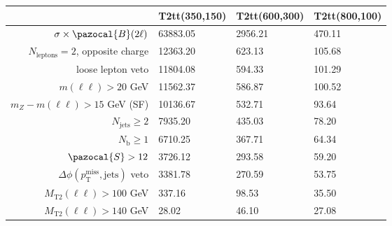\documentclass[10pt,oneside]{report}
\begin{document}
\begin{preview}
\begin{tabular}{r|lll}
                                                                    & T2tt(350,150) & T2tt(600,300) & T2tt(800,100) \\\hline
  $\sigma \times \pazocal{B}(2\ell)$                                &      63883.05 &       2956.21 &        470.11 \\
  $N_{\textrm{leptons}}=2$, opposite charge                         &      12363.20 &        623.13 &        105.68 \\
  loose lepton veto                                                 &      11804.08 &        594.33 &        101.29 \\
  $m(\ell\ell)>20$ GeV                                              &      11562.37 &        586.87 &        100.52 \\
  $m_{Z}-m(\ell\ell) > 15$ GeV (SF)                                 &      10136.67 &        532.71 &         93.64 \\
  $N_{\textrm{jets}}\geq2$                                          &       7935.20 &        435.03 &         78.20 \\
  $N_{\textrm{b}}\geq1$                                             &       6710.25 &        367.71 &         64.34 \\
  $\pazocal{S}>12$                                                  &       3726.12 &        293.58 &         59.20 \\
  $\Delta \phi(p_{\textrm{T}}^{\textrm{miss}}, \textrm{jets})$ veto &       3381.78 &        270.59 &         53.75 \\
  $M_{\textrm{T2}}(\ell\ell)>100$ GeV                               &        337.16 &         98.53 &         35.50 \\
  $M_{\textrm{T2}}(\ell\ell)>140$ GeV                               &         28.02 &         46.10 &         27.08 \\

\end{tabular}
\end{preview}
\end{document}
